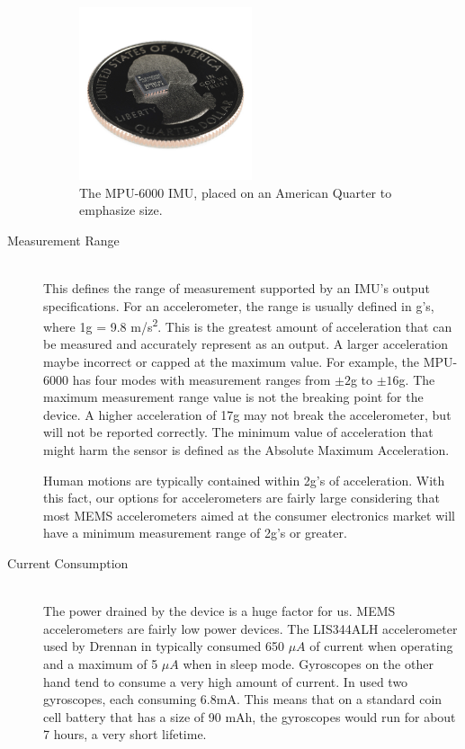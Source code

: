 \begin{description}
\begin{figure}
\begin{center}
\includegraphics[width=0.5\textwidth]{images/MPU6000Size.jpg}
\caption{The MPU-6000 IMU, placed on an American Quarter to emphasize size.}
\label{fig:MPU6000Size}
\end{center}
\end{figure}

\item[Measurement Range] \hfill \\
This defines the range of measurement supported by an IMU's output specifications.
For an accelerometer, the range is usually defined in g's, where 1g = 9.8 m/s\textsuperscript{2}.
This is the greatest amount of acceleration that can be measured and accurately represent as an output.
A larger acceleration maybe incorrect or capped at the maximum value.
For example, the MPU-6000 has four modes with measurement ranges from $\pm{2}$g to $\pm{16}$g.
The maximum measurement range value is not the breaking point for the device.
A higher acceleration of 17g may not break the accelerometer, but will not be reported correctly.
The minimum value of acceleration that might harm the sensor is defined as the Absolute Maximum Acceleration.
 
Human motions are typically contained within 2g's of acceleration.
With this fact, our options for accelerometers are fairly large
considering that most MEMS accelerometers aimed at the consumer electronics market will have a minimum measurement range of 2g's or greater. 
\hfill 
\item[Current Consumption] \hfill \\
The power drained by the device is a huge factor for us.
MEMS accelerometers are fairly low power devices.
The LIS344ALH accelerometer used by Drennan in \cite{drennan2010assessment} typically consumed 650 $\mu{A}$ of current when operating and a maximum of 5 $\mu{A}$ when in sleep mode.
Gyroscopes on the other hand tend to consume a very high amount of current.
In \cite{drennan2010assessment} used two gyroscopes, each consuming 6.8mA.
This means that on a standard coin cell battery that has a size of 90 mAh,
the gyroscopes would run for about 7 hours, a very short lifetime.


\end{description}
